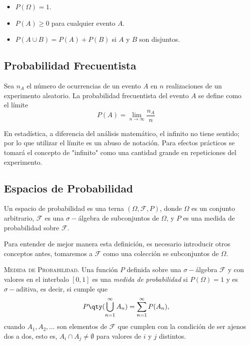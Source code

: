 \begin{itemize}
	\item $P(\Omega) = 1$.
	\item $P(A) \geq 0$ para cualquier evento $A$.
	\item $P(A\cup B) = P(A) + P(B)$ si $A$ y $B$ son disjuntos.
\end{itemize}

\subsection{Probabilidad Frecuentista}

Sea $n_A$ el número de ocurrencias de un evento $A$ en $n$ realizaciones de un experimento aleatorio. La probabilidad frecuentista del evento $A$ se define como el límite
\begin{equation}
	P(A) = \lim _{n\to \infty} \frac{n_A}{n} \label{prob_frecuentista}
\end{equation}

En estadística, a diferencia del análisis matemático, el infinito no tiene sentido; por lo que utilizar el límite es un abuso de notación. Para efectos prácticos se tomará el concepto de "infinito" como una cantidad grande en repeticiones del experimento.

\subsection{Espacios de Probabilidad}

\begin{definicion}
	Un espacio de probabilidad es una terna $(\Omega , \mathscr{F}, P)$, donde $\Omega$ es un conjunto arbitrario, $\mathscr{F}$ es una $\sigma -$álgebra de subconjuntos de $\Omega$, y $P$ es una medida de probabilidad sobre $\mathscr{F}$.
\end{definicion}

Para entender de mejor manera esta definición, es necesario introducir otros conceptos antes, tomaremos a $\mathscr{F}$ como una colección se subconjuntos de $\Omega$.

\begin{definicion}
	{\scshape{Medida de Probabilidad.}} Una función $P$ definida sobre una $\sigma -$álgebra $\mathscr{F}$ y con valores en el interbalo $[0,1]$ es una \textit{medida de probabilidad} si $P(\Omega) = 1$ y es $\sigma -$aditiva, es decir, si cumple que
	$$P\qty( \bigcup _{n=1} ^\infty A_n) = \sum _{n=1} ^\infty P(A_n),$$
	cuando $A_1, A_2, \ldots $ son elementos de $\mathscr{F}$ que cumplen con la condición de ser ajenos dos a dos, esto es, $A_i \cap A_j \neq \emptyset$ para valores de $i$ y $j$ distintos.
\end{definicion}


